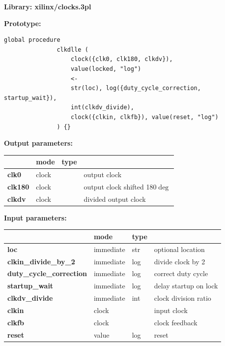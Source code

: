             {\bf Library: xilinx/clocks.3pl}

            {\bf Prototype:} \\
            \vsp
            \begin{lstlisting}[gobble=12, language=threepl]
               global procedure
               clkdlle (
                   clock({clk0, clk180, clkdv}),
                   value(locked, "log")
                   <-
                   str(loc), log({duty_cycle_correction, startup_wait}),
                   int(clkdv_divide),
                   clock({clkin, clkfb}), value(reset, "log")
               ) {}
            \end{lstlisting}

            {\bf Output parameters:} \\
            \begin{tabular}{| l | l | l | l |}
            \hline
                           & mode  & type   & \\
            \hline \hline
            {\bf clk0}     & clock &        & output clock \\ \hline
            {\bf clk180}   & clock &        & output clock shifted 180$\deg$ \\ \hline
            {\bf clkdv}    & clock &        & divided output clock \\ \hline
            \end{tabular}

            {\bf Input parameters:} \\            
            \begin{tabular}{| l | l | l | l |}
            \hline
                           & mode  & type   & \\
            \hline \hline
            {\bf loc}                     & immediate & str   & optional location \\ \hline
            {\bf clkin\_divide\_by\_2}    & immediate & log   & divide clock by 2 \\ \hline
            {\bf duty\_cycle\_correction} & immediate & log   & correct duty cycle \\ \hline
            {\bf startup\_wait}           & immediate & log   & delay startup on lock \\ \hline
            {\bf clkdv\_divide}           & immediate & int   & clock division ratio \\ \hline
            {\bf clkin}                   & clock     &       & input clock \\ \hline
            {\bf clkfb}                   & clock     &       & clock feedback \\ \hline
            {\bf reset}                   & value     & log   & reset \\ \hline
            \end{tabular}

